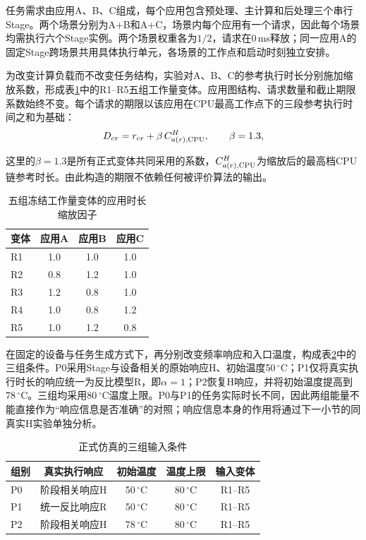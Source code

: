 任务需求由应用A、B、C组成，每个应用包含预处理、主计算和后处理三个串行Stage。两个场景分别为A+B和A+C，场景内每个应用有一个请求，因此每个场景均需执行六个Stage实例。两个场景权重各为$1/2$，请求在0\,ms释放；同一应用A的固定Stage跨场景共用具体执行单元，各场景的工作点和启动时刻独立安排。

为改变计算负载而不改变任务结构，实验对A、B、C的参考执行时长分别施加缩放系数，形成表\ref{tab:exp-workload}中的R1--R5五组工作量变体。应用图结构、请求数量和截止期限系数始终不变。每个请求的期限以该应用在CPU最高工作点下的三段参考执行时间之和为基础：
\begin{equation}
 D_{cr}=r_{cr}+\beta\,C_{a(r),{\rm CPU}}^{H},
 \qquad \beta=1.3,
 \label{eq:exp-deadline-generation}
\end{equation}

这里的$\beta=1.3$是所有正式变体共同采用的系数，$C_{a(r),{\rm CPU}}^{H}$为缩放后的最高档CPU链参考时长。由此构造的期限不依赖任何被评价算法的输出。
\begin{table}[htbp]
\centering
\caption{五组冻结工作量变体的应用时长缩放因子}
\label{tab:exp-workload}
\begin{tabular}{lccc}
\toprule
变体 & 应用A & 应用B & 应用C\\
\midrule
R1 & 1.0 & 1.0 & 1.0\\
R2 & 0.8 & 1.2 & 1.0\\
R3 & 1.2 & 0.8 & 1.0\\
R4 & 1.0 & 0.8 & 1.2\\
R5 & 1.0 & 1.2 & 0.8\\
\bottomrule
\end{tabular}
\end{table}

在固定的设备与任务生成方式下，再分别改变频率响应和入口温度，构成表\ref{tab:exp-groups}中的三组条件。P0采用Stage与设备相关的原始响应H、初始温度50\,$^\circ$C；P1仅将真实执行时长的响应统一为反比模型R，即$\alpha=1$；P2恢复H响应，并将初始温度提高到78\,$^\circ$C。三组均采用80\,$^\circ$C温度上限。P0与P1的任务实际时长不同，因此两组能量不能直接作为“响应信息是否准确”的对照；响应信息本身的作用将通过下一小节的同真实H实验单独分析。
\begin{table}[htbp]
\centering
\caption{正式仿真的三组输入条件}
\label{tab:exp-groups}
\begin{tabular}{lcccc}
\toprule
组别 & 真实执行响应 & 初始温度 & 温度上限 & 输入变体 \\
\midrule
P0 & 阶段相关响应H & 50\,$^\circ$C & 80\,$^\circ$C & R1--R5 \\
P1 & 统一反比响应R & 50\,$^\circ$C & 80\,$^\circ$C & R1--R5 \\
P2 & 阶段相关响应H & 78\,$^\circ$C & 80\,$^\circ$C & R1--R5 \\
\bottomrule
\end{tabular}
\end{table}

